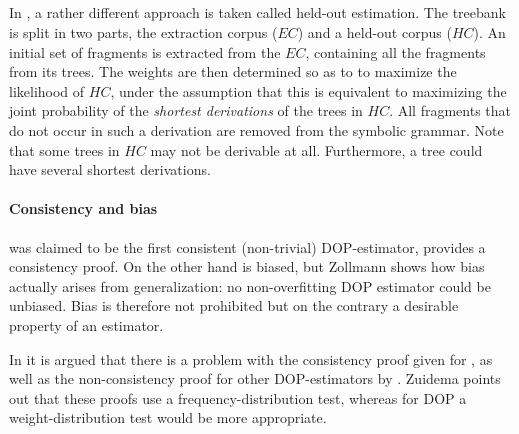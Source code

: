 \subsection{\dops}
In \dops{} \cite{zollmann2005}, a rather different approach is taken called held-out estimation. The treebank is split in two parts, the extraction corpus ($EC$) and a held-out corpus ($HC$). An initial set of fragments is extracted from the $EC$, containing all the fragments from its trees. The weights are then determined so as to to maximize the likelihood of $HC$, under the assumption that this is equivalent to maximizing the joint probability of the \emph{shortest derivations} of the trees in $HC$. All fragments that do not occur in such a derivation are removed from the symbolic grammar. 
Note that some trees in $HC$ may not be derivable at all. Furthermore, a tree could have several shortest derivations. 

\paragraph{Consistency and bias}
\dops{} was claimed to be the first consistent (non-trivial) DOP-estimator, \cite{zollmann2005} provides a consistency proof. On the other hand \dops{} is  biased, but Zollmann shows how bias actually arises from generalization: no non-overfitting DOP estimator could be unbiased. Bias is therefore not prohibited but on the contrary a desirable property of an estimator.

In \cite{zuidema2006} it is argued that there is a problem with the consistency proof given for \dops{}, as well as the non-consistency proof for other DOP-estimators by \cite{johnson2002}. Zuidema points out that these proofs use a frequency-distribution test, whereas for DOP a weight-distribution test would be more appropriate. 






















